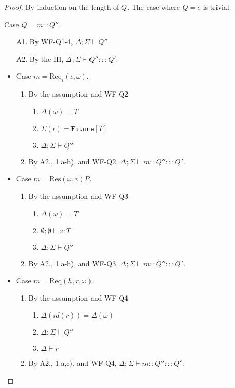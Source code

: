 \documentclass{article}
\theoremstyle{definition}
\newcommand{\Req}[3]{\text{Req}(#1, #2, #3)}
\newcommand{\Res}[2]{\text{Res}(#1, #2)}
\newcommand{\ReqF}[2]{\text{Req}_{\iota}(#1, #2)}
\begin{document}
\begin{proof}
By induction on the length of $Q$. The case where $Q = \epsilon$ is trivial.

Case $Q = m :: Q''$.
\begin{enumerate}
\item[A1.] By WF-Q1-4, $\Delta ; \Sigma \vdash Q''$.
\item[A2.] By the IH, $\Delta ; \Sigma \vdash Q'' ::: Q'$.
\end{enumerate}

\begin{itemize}
\item Case $m = {\ReqF \iota \omega}$.
\begin{enumerate}
\item By the assumption and WF-Q2
  \begin{enumerate}[label=(\alph*)]
  \item $\Delta(\omega) = T$
  \item $\Sigma(\iota) = \texttt{Future}[T]$
  \item $\Delta ; \Sigma \vdash Q''$
  \end{enumerate}
\item By A2., 1.a-b), and WF-Q2, $\Delta ; \Sigma \vdash m :: Q'' ::: Q'$.
\end{enumerate}

\item Case $m = {\Res \omega v P}$.
\begin{enumerate}
\item By the assumption and WF-Q3
  \begin{enumerate}[label=(\alph*)]
  \item $\Delta(\omega) = T$
  \item $\emptyset ; \emptyset \vdash v : T$
  \item $\Delta ; \Sigma \vdash Q''$
  \end{enumerate}
\item By A2., 1.a-b), and WF-Q3, $\Delta ; \Sigma \vdash m :: Q'' ::: Q'$.
\end{enumerate}

\item Case $m = {\Req h r \omega}$.
\begin{enumerate}
\item By the assumption and WF-Q4
  \begin{enumerate}[label=(\alph*)]
  \item $\Delta(id(r)) = \Delta(\omega)$
  \item $\Delta ; \Sigma \vdash Q''$
  \item $\Delta \vdash r$
  \end{enumerate}
\item By A2., 1.a,c), and WF-Q4, $\Delta ; \Sigma \vdash m :: Q'' ::: Q'$.
\end{enumerate}
\end{itemize}
\end{proof}
\end{document}
